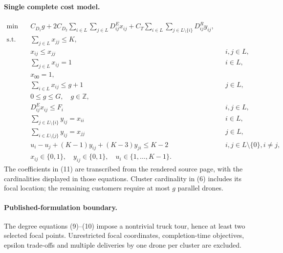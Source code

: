 \documentclass[11pt]{article}
\begin{document}
\paragraph{Single complete cost model.}
\begin{align}
\min\quad &C_{D_1}g+2C_{D_2}\sum_{i\in L}\sum_{j\in L}D^E_{ij}x_{ij}
 +C_T\sum_{i\in L}\sum_{j\in L\setminus\{i\}}D^R_{ij}y_{ij},\tag{1}\\
\text{s.t.}\quad &\sum_{j\in L}x_{jj}\le K,\tag{2}\\
&x_{ij}\le x_{jj} &&i,j\in L,\tag{3}\\
&\sum_{j\in L}x_{ij}=1 &&i\in L,\tag{4}\\
&x_{00}=1,\tag{5}\\
&\sum_{i\in L}x_{ij}\le g+1 &&j\in L,\tag{6}\\
&0\le g\le G,\quad g\in\mathbb Z,\tag{7}\\
&D^E_{ij}x_{ij}\le F_i &&i,j\in L,\tag{8}\\
&\sum_{j\in L\setminus\{i\}}y_{ij}=x_{ii} &&i\in L,\tag{9}\\
&\sum_{i\in L\setminus\{j\}}y_{ij}=x_{jj} &&j\in L,\tag{10}\\
&u_i-u_j+(K-1)y_{ij}+(K-3)y_{ji}\le K-2
 &&i,j\in L\setminus\{0\},i\ne j,\tag{11}\\
&x_{ij}\in\{0,1\},\quad y_{ij}\in\{0,1\},\quad
 u_i\in\{1,\ldots,K-1\}.\tag{12}
\end{align}
The coefficients in (11) are transcribed from the rendered source page,
with the cardinalities displayed in those equations.
Cluster cardinality in (6) includes its focal location; the remaining
customers require at most $g$ parallel drones.

\paragraph{Published-formulation boundary.}
The degree equations (9)--(10) impose a nontrivial truck tour, hence at
least two selected focal points.
Unrestricted focal coordinates, completion-time objectives, epsilon
trade-offs and multiple deliveries by one drone per cluster are excluded.
\end{document}
